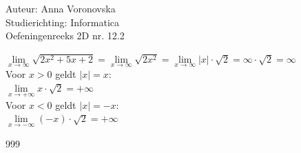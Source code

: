 \documentclass[a4paper]{article}
\begin{document}
  
\noindent \large Auteur: Anna Voronovska \\
\noindent \large Studierichting: Informatica\\
\noindent \large Oefeningenreeks 2D nr. 12.2\\

\medskip

\normalsize

$\lim\limits_{x \to \infty} \sqrt{2x^2+5x+2} = \lim\limits_{x \to \infty} \sqrt{2x^2} = \lim\limits_{x \to \infty} |x| \cdot \sqrt{2} = \infty \cdot \sqrt{2} = \infty$\\

Voor $x > 0$ geldt $|x| = x$: \\

$\lim\limits_{x \to +\infty} x \cdot \sqrt{2} = +\infty$ \\

Voor $x < 0$ geldt $|x| = -x$: \\

$\lim\limits_{x \to -\infty} (-x) \cdot \sqrt{2} = +\infty$ \\



\begin{thebibliography}{999}
\end{thebibliography}
\end{document}

